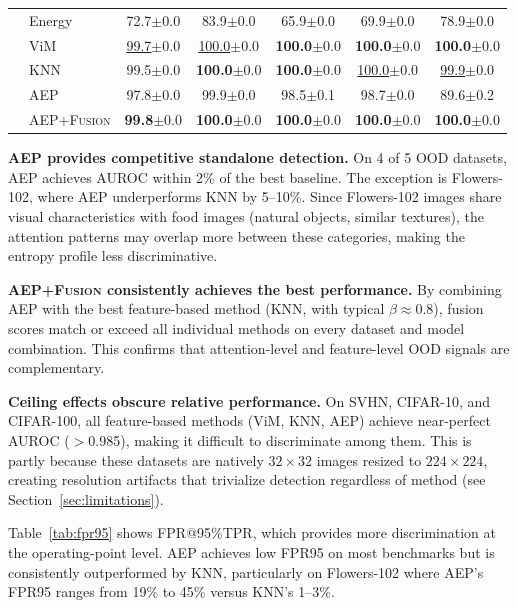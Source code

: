 \documentclass{article}
\newcommand{\AEP}{\textsc{AEP}}
\newcommand{\AEPFusion}{\textsc{AEP+Fusion}}
\begin{document}
\begin{table}[t]
\begin{tabular}{llccccc}
& Energy & 72.7$\pm$0.0 & 83.9$\pm$0.0 & 65.9$\pm$0.0 & 69.9$\pm$0.0 & 78.9$\pm$0.0 \\
& ViM & \underline{99.7}$\pm$0.0 & \underline{100.0}$\pm$0.0 & \textbf{100.0}$\pm$0.0 & \textbf{100.0}$\pm$0.0 & \textbf{100.0}$\pm$0.0 \\
& KNN & 99.5$\pm$0.0 & \textbf{100.0}$\pm$0.0 & \textbf{100.0}$\pm$0.0 & \underline{100.0}$\pm$0.0 & \underline{99.9}$\pm$0.0 \\
& \AEP{} & 97.8$\pm$0.0 & 99.9$\pm$0.0 & 98.5$\pm$0.1 & 98.7$\pm$0.0 & 89.6$\pm$0.2 \\
& \AEPFusion{} & \textbf{99.8}$\pm$0.0 & \textbf{100.0}$\pm$0.0 & \textbf{100.0}$\pm$0.0 & \textbf{100.0}$\pm$0.0 & \textbf{100.0}$\pm$0.0 \\
\bottomrule
\end{tabular}
\end{table}

\textbf{\AEP{} provides competitive standalone detection.} On 4 of 5 OOD datasets, \AEP{} achieves AUROC within 2\% of the best baseline. The exception is Flowers-102, where \AEP{} underperforms KNN by 5--10\%. Since Flowers-102 images share visual characteristics with food images (natural objects, similar textures), the attention patterns may overlap more between these categories, making the entropy profile less discriminative.

\textbf{\AEPFusion{} consistently achieves the best performance.} By combining \AEP{} with the best feature-based method (KNN, with typical $\beta \approx 0.8$), fusion scores match or exceed all individual methods on every dataset and model combination. This confirms that attention-level and feature-level OOD signals are complementary.

\textbf{Ceiling effects obscure relative performance.} On SVHN, CIFAR-10, and CIFAR-100, all feature-based methods (ViM, KNN, \AEP{}) achieve near-perfect AUROC ($>$0.985), making it difficult to discriminate among them. This is partly because these datasets are natively $32 \times 32$ images resized to $224 \times 224$, creating resolution artifacts that trivialize detection regardless of method (see Section~\ref{sec:limitations}).

Table~\ref{tab:fpr95} shows FPR@95\%TPR, which provides more discrimination at the operating-point level. \AEP{} achieves low FPR95 on most benchmarks but is consistently outperformed by KNN, particularly on Flowers-102 where \AEP{}'s FPR95 ranges from 19\% to 45\% versus KNN's 1--3\%.
\end{document}
